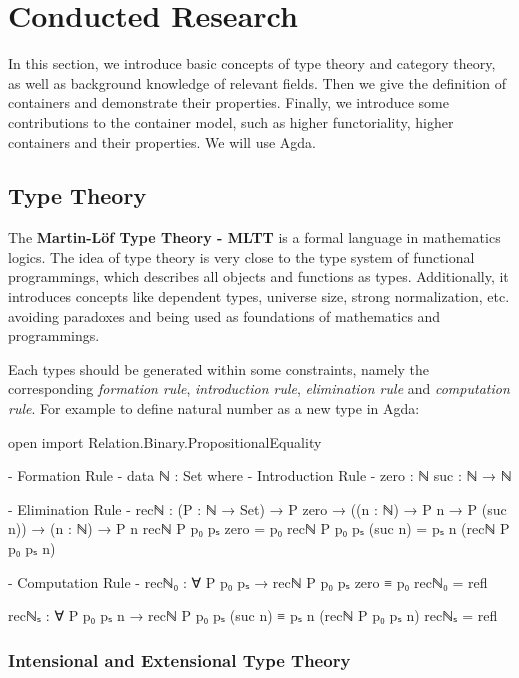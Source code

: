 \chapter{Conducted Research}

In this section, we introduce basic concepts of type theory and category theory, as well as background knowledge of relevant fields. Then we give the definition of containers and demonstrate their properties. Finally, we introduce some contributions to the container model, such as higher functoriality, higher containers and their properties. We will use Agda.

\section{Type Theory}

The \textbf{Martin-L\"of Type Theory - MLTT} is a formal language in mathematics logics. The idea of type theory is very close to the type system of functional programmings, which describes all objects and functions as types. Additionally, it introduces concepts like dependent types, universe size, strong normalization, etc. avoiding paradoxes and being used as foundations of mathematics and programmings.

Each types should be generated within some constraints, namely the corresponding \textit{formation rule}, \textit{introduction rule}, \textit{elimination rule} and \textit{computation rule}. For example to define natural number  as a new type in Agda:

\begin{code}[hide]
open import Relation.Binary.PropositionalEquality
\end{code}

\begin{code}
{- Formation Rule -}
data ℕ : Set where
{- Introduction Rule -}
  zero : ℕ
  suc  : ℕ → ℕ

{- Elimination Rule -}
recℕ : (P : ℕ → Set)
  → P zero
  → ((n : ℕ) → P n → P (suc n))
  → (n : ℕ) → P n
recℕ P p₀ pₛ zero = p₀
recℕ P p₀ pₛ (suc n) = pₛ n (recℕ P p₀ pₛ n)

{- Computation Rule -}
recℕ₀ : ∀ {P p₀ pₛ} → recℕ P p₀ pₛ zero ≡ p₀
recℕ₀ = refl

recℕₛ : ∀ {P p₀ pₛ n} → recℕ P p₀ pₛ (suc n) ≡ pₛ n (recℕ P p₀ pₛ n)
recℕₛ = refl
\end{code}

\subsection{Intensional and Extensional Type Theory}

